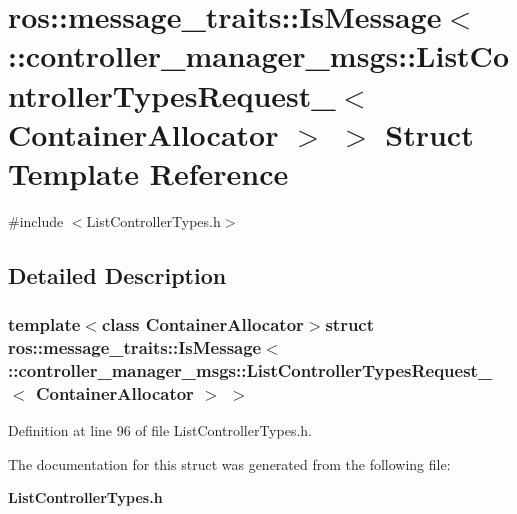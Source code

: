 \section{ros\-:\-:message\-\_\-traits\-:\-:\-Is\-Message$<$ \-:\-:controller\-\_\-manager\-\_\-msgs\-:\-:\-List\-Controller\-Types\-Request\-\_\-$<$ \-Container\-Allocator $>$ $>$ \-Struct \-Template \-Reference}
\label{structros_1_1message__traits_1_1IsMessage_3_01_1_1controller__manager__msgs_1_1ListControllerTypb9c26301192e3344ad6bd064548180b0}


{\ttfamily \#include $<$\-List\-Controller\-Types.\-h$>$}



\subsection{\-Detailed \-Description}
\subsubsection*{template$<$class Container\-Allocator$>$struct ros\-::message\-\_\-traits\-::\-Is\-Message$<$ \-::controller\-\_\-manager\-\_\-msgs\-::\-List\-Controller\-Types\-Request\-\_\-$<$ Container\-Allocator $>$ $>$}



\-Definition at line 96 of file \-List\-Controller\-Types.\-h.



\-The documentation for this struct was generated from the following file\-:\begin{DoxyCompactItemize}
\item 
{\bf \-List\-Controller\-Types.\-h}\end{DoxyCompactItemize}
